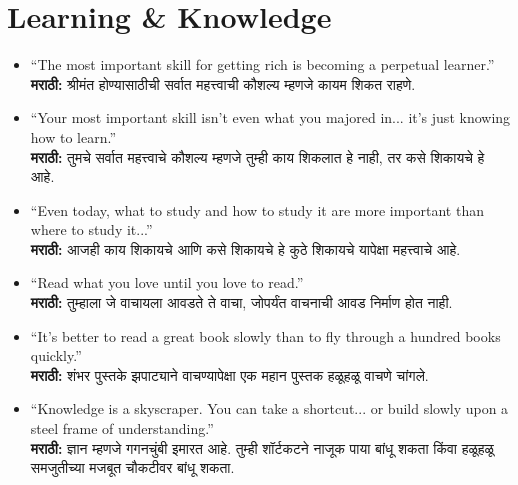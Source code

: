 \section*{Learning \& Knowledge}
\begin{itemize}
    \item ``The most important skill for getting rich is becoming a perpetual learner.'' \\
    \textbf{मराठी:} श्रीमंत होण्यासाठीची सर्वात महत्त्वाची कौशल्य म्हणजे कायम शिकत राहणे.

    \item ``Your most important skill isn’t even what you majored in... it’s just knowing how to learn.'' \\
    \textbf{मराठी:} तुमचे सर्वात महत्त्वाचे कौशल्य म्हणजे तुम्ही काय शिकलात हे नाही, तर कसे शिकायचे हे आहे.

    \item ``Even today, what to study and how to study it are more important than where to study it...'' \\
    \textbf{मराठी:} आजही काय शिकायचे आणि कसे शिकायचे हे कुठे शिकायचे यापेक्षा महत्त्वाचे आहे.

    \item ``Read what you love until you love to read.'' \\
    \textbf{मराठी:} तुम्हाला जे वाचायला आवडते ते वाचा, जोपर्यंत वाचनाची आवड निर्माण होत नाही.

    \item ``It’s better to read a great book slowly than to fly through a hundred books quickly.'' \\
    \textbf{मराठी:} शंभर पुस्तके झपाट्याने वाचण्यापेक्षा एक महान पुस्तक हळूहळू वाचणे चांगले.

    \item ``Knowledge is a skyscraper. You can take a shortcut... or build slowly upon a steel frame of understanding.'' \\
    \textbf{मराठी:} ज्ञान म्हणजे गगनचुंबी इमारत आहे. तुम्ही शॉर्टकटने नाजूक पाया बांधू शकता किंवा हळूहळू समजुतीच्या मजबूत चौकटीवर बांधू शकता.
\end{itemize}

